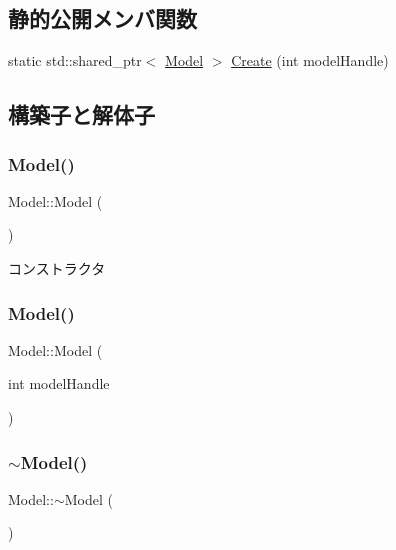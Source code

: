 \subsection*{静的公開メンバ関数}
\begin{DoxyCompactItemize}
\item 
static std\+::shared\+\_\+ptr$<$ \mbox{\hyperlink{class_model}{Model}} $>$ \mbox{\hyperlink{class_model_a82c645e8d4ca6f65297751dc9453d6af}{Create}} (int model\+Handle)
\end{DoxyCompactItemize}


\subsection{構築子と解体子}
\mbox{\label{class_model_ae3b375de5f6df4faf74a95d64748e048}} 
\subsubsection{\texorpdfstring{Model()}{Model()}\hspace{0.1cm}{\footnotesize\ttfamily [1/2]}}
{\footnotesize\ttfamily Model\+::\+Model (\begin{DoxyParamCaption}{ }\end{DoxyParamCaption})}



コンストラクタ 

\mbox{\label{class_model_afce3f8d94c9a80c814df5546346f6efb}} 
\subsubsection{\texorpdfstring{Model()}{Model()}\hspace{0.1cm}{\footnotesize\ttfamily [2/2]}}
{\footnotesize\ttfamily Model\+::\+Model (\begin{DoxyParamCaption}\item[{int}]{model\+Handle }\end{DoxyParamCaption})}

\mbox{\label{class_model_ad6ebd2062a0b823db841a0b88baac4c0}} 
\subsubsection{\texorpdfstring{$\sim$\+Model()}{~Model()}}
{\footnotesize\ttfamily Model\+::$\sim$\+Model (\begin{DoxyParamCaption}{ }\end{DoxyParamCaption})}



